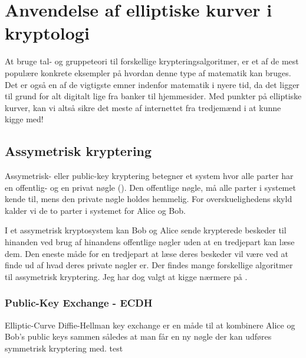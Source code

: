 \section{Anvendelse af elliptiske kurver i kryptologi}
At bruge tal- og gruppeteori til forskellige krypteringsalgoritmer, er et af de mest populære konkrete eksempler på hvordan denne type af matematik kan bruges. Det er også en af de vigtigste emner indenfor matematik i nyere tid, da det ligger til grund for alt digitalt lige fra banker til hjemmesider. Med punkter på elliptiske kurver, kan vi altså sikre det meste af internettet fra tredjemænd i at kunne kigge med!

\subsection{Assymetrisk kryptering}
Assymetrisk- eller public-key kryptering betegner et system hvor alle parter har en offentlig- og en privat nøgle (\cite{seanriley2017}). Den offentlige nøgle, må alle parter i systemet kende til, mens den private nøgle holdes hemmelig. For overskuelighedens skyld kalder vi de to parter i systemet for Alice og Bob.

I et assymetrisk kryptosystem kan Bob og Alice sende krypterede beskeder til hinanden ved brug af hinandens offentlige nøgler uden at en tredjepart kan læse dem. Den eneste måde for en tredjepart at læse deres beskeder vil være ved at finde ud af hvad deres private nøgler er. Der findes mange forskellige algoritmer til assymetrisk kryptering. Jeg har dog valgt at kigge nærmere på . 

\subsubsection{Public-Key Exchange - ECDH}
Elliptic-Curve Diffie-Hellman key exchange er en måde til at kombinere Alice og Bob’s public keys sammen således at man får en ny nøgle der kan udføres symmetrisk kryptering med. test


